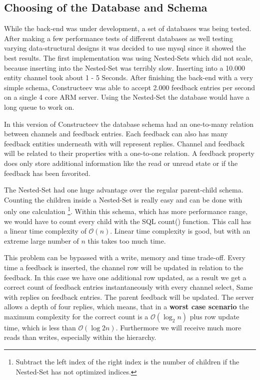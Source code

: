 \subsection{Choosing of the Database and Schema}
\textcolor{newcode}{While the back-end was under development, a set of databases was being tested. After making a few performance tests of different databases as well testing varying data-structural designs it was decided to use mysql since it showed the best results. The first implementation was using Nested-Sets which did not scale, because inserting into the Nested-Set was terribly slow. Inserting into a 10.000 entity channel took about 1 - 5 Seconds. After finishing the back-end with a very simple schema, Constructeev was able to accept 2.000 feedback entries per second on a single 4 core ARM server. Using the Nested-Set the database would have a long queue to work on.}

\textcolor{newcode}{In this version of Constructeev the database schema had an one-to-many relation between channels and feedback entries. Each feedback can also has many feedback entities underneath with will represent replies. Channel and feedback will be related to their properties with a one-to-one relation. A feedback property does only store additional information like the read or unread state or if the feedback has been favorited.}

\textcolor{newcode}{The Nested-Set had one huge advantage over the regular parent-child schema. Counting the children inside a Nested-Set is really easy and can be done with only one calculation \footnote{Subtract the left index of the right index is the number of children if the Nested-Set has not optimized indices.}. Within this schema, which has more performance range, we would have to count every child with the SQL count() function. This call has a linear time complexity of $\mathcal{O}(n)$. Linear time complexity is good, but with an extreme large number of $n$ this takes too much time.}

\textcolor{newcode}{
This problem can be bypassed with a write, memory and time trade-off. Every time a feedback is inserted, the channel row will be updated in relation to the feedback. In this case we have one additional row updated, as a result we get a correct count of feedback entries instantaneously with every channel select, Same with replies on feedback entries. The parent feedback will be updated. The server allows a depth of four replies, which means, that in a \textbf{worst case scenario} the maximum complexity for the correct count is a $\mathcal{O}(\log _2 {n})$ plus row update time, which is less than $\mathcal{O}(\log{2}{n})$. Furthermore we will receive much more reads than writes, especially within the hierarchy.}
	
